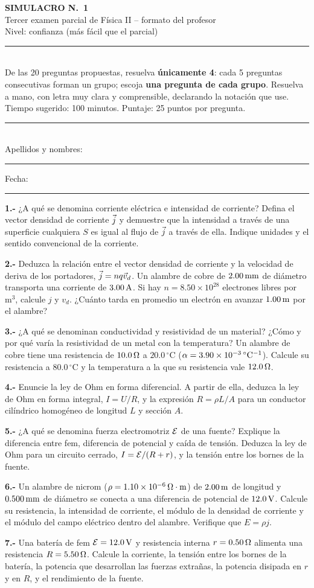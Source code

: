 \documentclass[11pt]{article}
\newcommand{\cabecera}[3]{%
\begin{center}
{\Large\bfseries SIMULACRO N.\textordmasculine\ #1}\\[2pt]
{\large Tercer examen parcial de Física II -- formato del profesor}\\[2pt]
{\normalsize Nivel: #2}
\end{center}
\noindent\rule{\linewidth}{0.6pt}\\
{\small De las 20 preguntas propuestas, resuelva \textbf{únicamente 4}: cada 5 preguntas consecutivas forman un grupo; escoja \textbf{una pregunta de cada grupo}. Resuelva a mano, con letra muy clara y comprensible, declarando la notación que use. Tiempo sugerido: #3. Puntaje: 25 puntos por pregunta.}\\
\noindent\rule{\linewidth}{0.6pt}\\[2pt]
Apellidos y nombres: \rule{6.5cm}{0.4pt}\hfill Fecha: \rule{3cm}{0.4pt}\par\medskip}
\newcommand{\grupo}[1]{\par\medskip{\color{azul}\bfseries Grupo #1}\par\smallskip}
\newcommand{\p}[1]{\par\smallskip\textbf{#1.-} }
\begin{document}
\cabecera{1}{confianza (más fácil que el parcial)}{100 minutos}

\grupo{I}
\p{1} ¿A qué se denomina corriente eléctrica e intensidad de corriente? Defina el vector densidad de corriente $\vj$ y demuestre que la intensidad a través de una superficie cualquiera $S$ es igual al flujo de $\vj$ a través de ella. Indique unidades y el sentido convencional de la corriente.

\p{2} Deduzca la relación entre el vector densidad de corriente y la velocidad de deriva de los portadores, $\vj=nq\vec v_d$. Un alambre de cobre de $2.00\uu{mm}$ de diámetro transporta una corriente de $3.00\uu{A}$. Si hay $n=8.50\times10^{28}$ electrones libres por $\mathrm{m^3}$, calcule $j$ y $v_d$. ¿Cuánto tarda en promedio un electrón en avanzar $1.00\uu{m}$ por el alambre?

\p{3} ¿A qué se denominan conductividad y resistividad de un material? ¿Cómo y por qué varía la resistividad de un metal con la temperatura? Un alambre de cobre tiene una resistencia de $10.0\ohm$ a $20.0\,^\circ\mathrm{C}$ ($\alpha=3.90\times10^{-3}\uu{^\circ C^{-1}}$). Calcule su resistencia a $80.0\,^\circ\mathrm{C}$ y la temperatura a la que su resistencia vale $12.0\ohm$.

\p{4} Enuncie la ley de Ohm en forma diferencial. A partir de ella, deduzca la ley de Ohm en forma integral, $I=U/R$, y la expresión $R=\rho L/A$ para un conductor cilíndrico homogéneo de longitud $L$ y sección $A$.

\p{5} ¿A qué se denomina fuerza electromotriz $\fem$ de una fuente? Explique la diferencia entre fem, diferencia de potencial y caída de tensión. Deduzca la ley de Ohm para un circuito cerrado, $I=\fem/(R+r)$, y la tensión entre los bornes de la fuente.

\grupo{II}
\p{6} Un alambre de nicrom ($\rho=1.10\times10^{-6}\ohm\cdot\mathrm{m}$) de $2.00\uu{m}$ de longitud y $0.500\uu{mm}$ de diámetro se conecta a una diferencia de potencial de $12.0\uu{V}$. Calcule su resistencia, la intensidad de corriente, el módulo de la densidad de corriente y el módulo del campo eléctrico dentro del alambre. Verifique que $E=\rho j$.

\p{7} Una batería de fem $\fem=12.0\uu{V}$ y resistencia interna $r=0.50\ohm$ alimenta una resistencia $R=5.50\ohm$. Calcule la corriente, la tensión entre los bornes de la batería, la potencia que desarrollan las fuerzas extrañas, la potencia disipada en $r$ y en $R$, y el rendimiento de la fuente.
\end{document}

